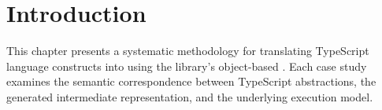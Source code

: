 \section{Introduction}

This chapter presents a systematic methodology for translating TypeScript language constructs into   using the library's object-based . Each case study examines the semantic correspondence between TypeScript abstractions, the generated intermediate representation, and the underlying execution model.


